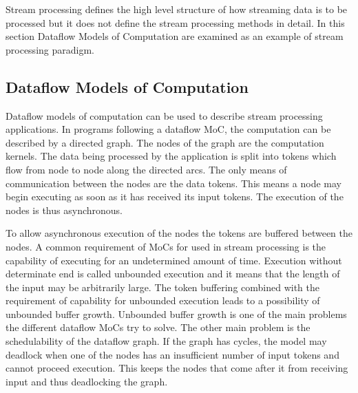 
Stream processing defines the high level structure of how streaming data is to be processed but it does not define the stream processing methods in detail. In this section Dataflow Models of Computation are examined as an example of stream processing paradigm.

\subsection{Dataflow Models of Computation}
\label{subsec:dataflow-moc}
Dataflow models of computation can be used to describe stream processing applications. In programs following a dataflow MoC, the computation can be described by a directed graph. The nodes of the graph are the computation kernels. The data being processed by the application is split into tokens which flow from node to node along the directed arcs. The only means of communication between the nodes are the data tokens. This means a node may begin executing as soon as it has received its input tokens. The execution of the nodes is thus asynchronous.~\cite{lee2015introduction}

To allow asynchronous execution of the nodes the tokens are buffered between the nodes. A common requirement of MoCs for used in stream processing is the capability of executing for an undetermined amount of time. Execution without determinate end is called unbounded execution and it means that the length of the input may be arbitrarily large. The token buffering combined with the requirement of capability for unbounded execution leads to a possibility of unbounded buffer growth. Unbounded buffer growth is one of the main problems the different dataflow MoCs try to solve. The other main problem is the schedulability of the dataflow graph. If the graph has cycles, the model may deadlock when one of the nodes has an insufficient number of input tokens and cannot proceed execution. This keeps the nodes that come after it from receiving input and thus deadlocking the graph.~\cite{lee2015introduction}

